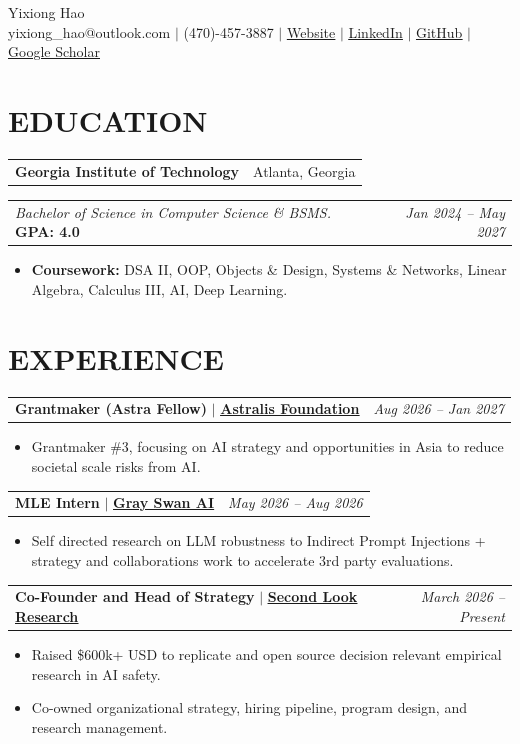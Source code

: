 \documentclass[11pt,letterpaper]{article}
\makeatletter
\newcommand{\ulink}[2]{\href{#1}{\underline{#2}}}
\newcommand{\entry}[2]{%
  \noindent\begin{tabular*}{\textwidth}{@{}l@{\extracolsep{\fill}}r@{}}%
    #1 & #2%
  \end{tabular*}\par\vspace{0.5pt}}
\newcommand{\role}[4]{\entry{\textbf{#1} $\mid$ \ulink{#3}{\textbf{#2}}}{\textit{#4}}}
\newenvironment{items}
  {\begin{itemize}[leftmargin=1.4em,topsep=0pt,partopsep=0pt,parsep=0pt,itemsep=0pt,label=\textbullet]}
  {\end{itemize}\vspace{1.5pt}}
\makeatother
\begin{document}
\begin{center}
  {\fontsize{19}{22}\selectfont Yixiong Hao}\\[3pt]
  yixiong\_hao@outlook.com $\mid$ (470)-457-3887 $\mid$
  \ulink{https://yixiong.dev/}{Website} $\mid$
  \ulink{https://www.linkedin.com/in/yixiong-hao/}{LinkedIn} $\mid$
  \ulink{https://github.com/YixiongHao}{GitHub} $\mid$
  \ulink{https://scholar.google.com/citations?user=TzkRf0QAAAAJ&hl=en}{Google Scholar}
\end{center}
\vspace{-9pt}

\section*{EDUCATION}
\entry{\textbf{Georgia Institute of Technology}}{Atlanta, Georgia}
\entry{\textit{Bachelor of Science in Computer Science \& BSMS.} \textbf{GPA: 4.0}}{\textit{Jan 2024 -- May 2027}}
\begin{items}
  \item \textbf{Coursework:} DSA II, OOP, Objects \& Design, Systems \& Networks, Linear Algebra, Calculus III, AI, Deep Learning.
\end{items}

\section*{EXPERIENCE}

\role{Grantmaker (Astra Fellow)}{Astralis Foundation}{https://astralisfoundation.org/}{Aug 2026 -- Jan 2027}
\begin{items}
  \item Grantmaker \#3, focusing on AI strategy and opportunities in Asia to reduce societal scale risks from AI.
\end{items}

\role{MLE Intern}{Gray Swan AI}{https://www.grayswan.ai/}{May 2026 -- Aug 2026}
\begin{items}
  \item Self directed research on LLM robustness to Indirect Prompt Injections + strategy and collaborations work to accelerate 3rd party evaluations.
\end{items}

\role{Co-Founder and Head of Strategy}{Second Look Research}{https://secondlookresearch.com/}{March 2026 -- Present}
\begin{items}
  \item Raised \$600k+ USD to replicate and open source decision relevant empirical research in AI safety.
  \item Co-owned organizational strategy, hiring pipeline, program design, and research management.
\end{items}
\end{document}
